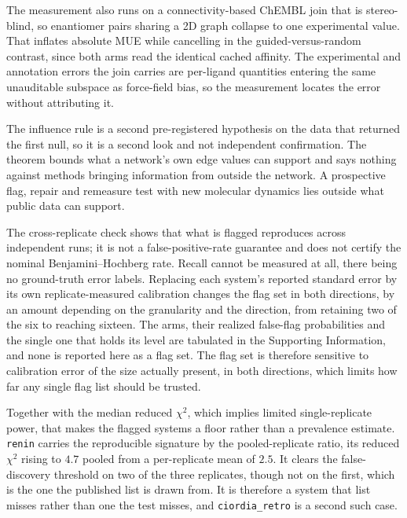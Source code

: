 The measurement also runs on a connectivity-based ChEMBL join that is stereo-blind, so enantiomer
pairs sharing a 2D graph collapse to one experimental value. That inflates absolute MUE while
cancelling in the guided-versus-random contrast, since both arms read the identical cached
affinity. The experimental and annotation errors the join carries are per-ligand quantities
entering the same unauditable subspace as force-field bias, so the measurement locates the error
without attributing it.

The influence rule is a second pre-registered hypothesis on the data that returned the first null,
so it is a second look and not independent confirmation. The theorem bounds what a network's own
edge values can support and says nothing against methods bringing information from outside the
network. A prospective flag, repair and remeasure test with new molecular dynamics lies outside
what public data can support.

The cross-replicate check shows that what is flagged reproduces across independent runs; it is not
a false-positive-rate guarantee and does not certify the nominal Benjamini--Hochberg rate. Recall
cannot be measured at all, there being no ground-truth error labels. Replacing each system's
reported standard error by its own replicate-measured calibration changes the flag set in both
directions, by an amount depending on the granularity and the direction, from retaining two of the
six to reaching sixteen. The arms, their realized false-flag probabilities and the single one that
holds its level are tabulated in the Supporting Information, and none is reported here as a flag
set. The flag set is therefore sensitive to calibration
error of the size actually present, in both directions, which limits how far any single flag list
should be trusted.

Together with the median reduced $\chi^2$, which implies limited single-replicate power,
that makes the flagged systems a floor rather than a prevalence estimate. \texttt{renin} carries
the reproducible signature by the pooled-replicate ratio, its reduced $\chi^2$ rising to $4.7$
pooled from a per-replicate mean of $2.5$. It clears the false-discovery threshold on two of the
three replicates, though not on the first, which is the one the published list is drawn from. It is
therefore a system that list misses rather than one the test misses, and \texttt{ciordia\_retro}
is a second such case.

